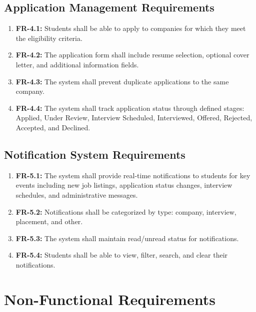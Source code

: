 \documentclass[12pt,a4paper]{report}
\begin{document}
\subsection{Application Management Requirements}
\begin{enumerate}
    \item \textbf{FR-4.1:} Students shall be able to apply to companies for which they meet the eligibility criteria.
    
    \item \textbf{FR-4.2:} The application form shall include resume selection, optional cover letter, and additional information fields.
    
    \item \textbf{FR-4.3:} The system shall prevent duplicate applications to the same company.
    
    \item \textbf{FR-4.4:} The system shall track application status through defined stages: Applied, Under Review, Interview Scheduled, Interviewed, Offered, Rejected, Accepted, and Declined.
\end{enumerate}

\subsection{Notification System Requirements}
\begin{enumerate}
    \item \textbf{FR-5.1:} The system shall provide real-time notifications to students for key events including new job listings, application status changes, interview schedules, and administrative messages.
    
    \item \textbf{FR-5.2:} Notifications shall be categorized by type: company, interview, placement, and other.
    
    \item \textbf{FR-5.3:} The system shall maintain read/unread status for notifications.
    
    \item \textbf{FR-5.4:} Students shall be able to view, filter, search, and clear their notifications.
\end{enumerate}

\section{Non-Functional Requirements}
\end{document}
